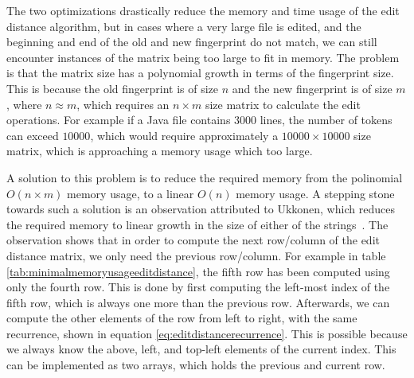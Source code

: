 The two optimizations drastically reduce the memory and time usage of the edit distance
algorithm, but in cases where a very large file is edited, and the beginning and end of
the old and new fingerprint do not match, we can still encounter instances of the matrix
being too large to fit in memory. The problem is that the matrix size has a polynomial
growth in terms of the fingerprint size. This is because the old fingerprint is of size
$n$ and the new fingerprint is of size $m$, where $n \approx m$, which requires an $n
\times m$ size matrix to calculate the edit operations. For example if a Java file
contains $3000$ lines, the number of tokens can exceed $10000$, which would require
approximately a $10000 \times 10000$ size matrix, which is approaching a memory usage
which too large.

A solution to this problem is to reduce the required memory from the polinomial $O(n \times m)$
memory usage, to a linear $O(n)$ memory usage. A stepping stone towards such a solution is
an observation attributed to Ukkonen, which reduces the required memory to linear growth
in the size of either of the strings~\cite{UkkonenEditDistance}. The observation shows
that in order to compute the next row/column of the edit distance matrix, we only need the
previous row/column. For example in table \ref{tab:minimalmemoryusageeditdistance}, the
fifth row has been computed using only the fourth row. This is done by first computing the
left-most index of the fifth row, which is always one more than the previous row.
Afterwards, we can compute the other elements of the row from left to right, with the same
recurrence, shown in equation \ref{eq:editdistancerecurrence}. This is possible because we
always know the above, left, and top-left elements of the current index. This can be
implemented as two arrays, which holds the previous and current row. 

